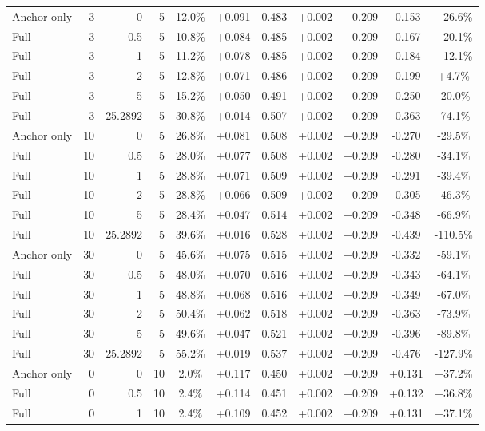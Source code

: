 \begin{table}[htbp]
\begin{tabular}{lrrrccccccc}
Anchor only & 3 & 0 & 5 & 12.0\% & +0.091 & 0.483 & +0.002 & +0.209 & -0.153 & +26.6\% \\
Full & 3 & 0.5 & 5 & 10.8\% & +0.084 & 0.485 & +0.002 & +0.209 & -0.167 & +20.1\% \\
Full & 3 & 1 & 5 & 11.2\% & +0.078 & 0.485 & +0.002 & +0.209 & -0.184 & +12.1\% \\
Full & 3 & 2 & 5 & 12.8\% & +0.071 & 0.486 & +0.002 & +0.209 & -0.199 & +4.7\% \\
Full & 3 & 5 & 5 & 15.2\% & +0.050 & 0.491 & +0.002 & +0.209 & -0.250 & -20.0\% \\
Full & 3 & 25.2892 & 5 & 30.8\% & +0.014 & 0.507 & +0.002 & +0.209 & -0.363 & -74.1\% \\
Anchor only & 10 & 0 & 5 & 26.8\% & +0.081 & 0.508 & +0.002 & +0.209 & -0.270 & -29.5\% \\
Full & 10 & 0.5 & 5 & 28.0\% & +0.077 & 0.508 & +0.002 & +0.209 & -0.280 & -34.1\% \\
Full & 10 & 1 & 5 & 28.8\% & +0.071 & 0.509 & +0.002 & +0.209 & -0.291 & -39.4\% \\
Full & 10 & 2 & 5 & 28.8\% & +0.066 & 0.509 & +0.002 & +0.209 & -0.305 & -46.3\% \\
Full & 10 & 5 & 5 & 28.4\% & +0.047 & 0.514 & +0.002 & +0.209 & -0.348 & -66.9\% \\
Full & 10 & 25.2892 & 5 & 39.6\% & +0.016 & 0.528 & +0.002 & +0.209 & -0.439 & -110.5\% \\
Anchor only & 30 & 0 & 5 & 45.6\% & +0.075 & 0.515 & +0.002 & +0.209 & -0.332 & -59.1\% \\
Full & 30 & 0.5 & 5 & 48.0\% & +0.070 & 0.516 & +0.002 & +0.209 & -0.343 & -64.1\% \\
Full & 30 & 1 & 5 & 48.8\% & +0.068 & 0.516 & +0.002 & +0.209 & -0.349 & -67.0\% \\
Full & 30 & 2 & 5 & 50.4\% & +0.062 & 0.518 & +0.002 & +0.209 & -0.363 & -73.9\% \\
Full & 30 & 5 & 5 & 49.6\% & +0.047 & 0.521 & +0.002 & +0.209 & -0.396 & -89.8\% \\
Full & 30 & 25.2892 & 5 & 55.2\% & +0.019 & 0.537 & +0.002 & +0.209 & -0.476 & -127.9\% \\
Anchor only & 0 & 0 & 10 & 2.0\% & +0.117 & 0.450 & +0.002 & +0.209 & +0.131 & +37.2\% \\
Full & 0 & 0.5 & 10 & 2.4\% & +0.114 & 0.451 & +0.002 & +0.209 & +0.132 & +36.8\% \\
Full & 0 & 1 & 10 & 2.4\% & +0.109 & 0.452 & +0.002 & +0.209 & +0.131 & +37.1\% \\

\end{tabular}
\end{table}
